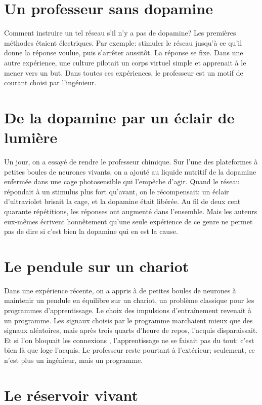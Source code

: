 \section*{Un professeur sans dopamine}

Comment instruire un tel réseau s'il n'y a pas de dopamine? Les premières méthodes étaient électriques. Par exemple: stimuler le réseau jusqu'à ce qu'il donne la réponse voulue, puis s'arrêter aussitôt. La réponse se fixe. Dans une autre expérience, une culture pilotait un \og corps\fg{} virtuel simple et apprenait à le mener vers un but. Dans toutes ces expériences, le professeur est un motif de courant choisi par l'ingénieur.

\section*{De la dopamine par un éclair de lumière}

Un jour, on a essayé de rendre le professeur chimique. Sur l'une des plateformes à petites boules de neurones vivants, on a ajouté au liquide nutritif de la dopamine enfermée dans une \og cage\fg{} photosensible qui l'empêche d'agir. Quand le réseau répondait à un stimulus plus fort qu'avant, on le \og récompensait\fg{}: un éclair d'ultraviolet brisait la cage, et la dopamine était libérée. Au fil de deux cent quarante répétitions, les réponses ont augmenté dans l'ensemble. Mais les auteurs eux-mêmes écrivent honnêtement qu'une seule expérience de ce genre ne permet pas de dire si c'est bien la dopamine qui en est la cause.

\section*{Le pendule sur un chariot}

Dans une expérience récente, on a appris à de petites boules de neurones à maintenir un pendule en équilibre sur un chariot, un problème classique pour les programmes d'apprentissage. Le choix des impulsions d'entraînement revenait à un programme. Les signaux choisis par le programme marchaient mieux que des signaux aléatoires, mais après trois quarts d'heure de repos, l'acquis disparaissait. Et si l'on bloquait les connexions , l'apprentissage ne se faisait pas du tout: c'est bien là que loge l'acquis. Le professeur reste pourtant à l'extérieur; seulement, ce n'est plus un ingénieur, mais un programme.

\section*{Le réservoir vivant}

